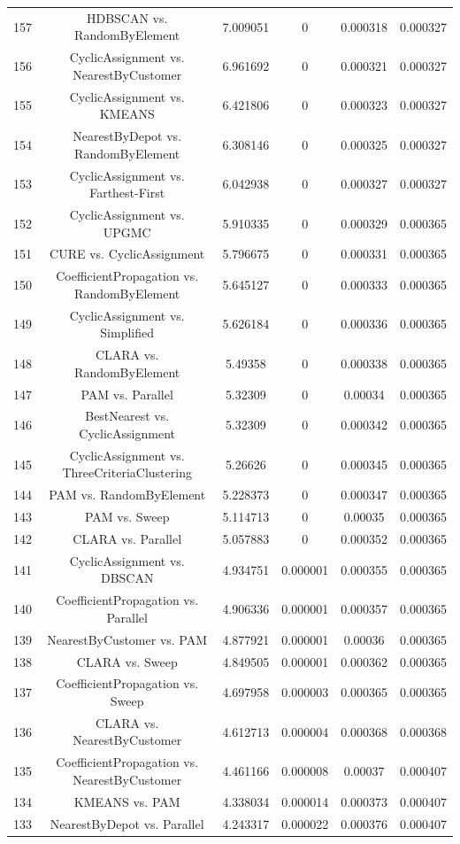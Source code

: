 \documentclass[a4paper,10pt]{article}
\begin{document}
\begin{landscape}
\begin{table}[!htp]
\begin{tabular}{cccccc}
157&HDBSCAN vs. RandomByElement&7.009051&0&0.000318&0.000327\\
156&CyclicAssignment vs. NearestByCustomer&6.961692&0&0.000321&0.000327\\
155&CyclicAssignment vs. KMEANS&6.421806&0&0.000323&0.000327\\
154&NearestByDepot vs. RandomByElement&6.308146&0&0.000325&0.000327\\
153&CyclicAssignment vs. Farthest-First&6.042938&0&0.000327&0.000327\\
152&CyclicAssignment vs. UPGMC&5.910335&0&0.000329&0.000365\\
151&CURE vs. CyclicAssignment&5.796675&0&0.000331&0.000365\\
150&CoefficientPropagation vs. RandomByElement&5.645127&0&0.000333&0.000365\\
149&CyclicAssignment vs. Simplified&5.626184&0&0.000336&0.000365\\
148&CLARA vs. RandomByElement&5.49358&0&0.000338&0.000365\\
147&PAM vs. Parallel&5.32309&0&0.00034&0.000365\\
146&BestNearest vs. CyclicAssignment&5.32309&0&0.000342&0.000365\\
145&CyclicAssignment vs. ThreeCriteriaClustering&5.26626&0&0.000345&0.000365\\
144&PAM vs. RandomByElement&5.228373&0&0.000347&0.000365\\
143&PAM vs. Sweep&5.114713&0&0.00035&0.000365\\
142&CLARA vs. Parallel&5.057883&0&0.000352&0.000365\\
141&CyclicAssignment vs. DBSCAN&4.934751&0.000001&0.000355&0.000365\\
140&CoefficientPropagation vs. Parallel&4.906336&0.000001&0.000357&0.000365\\
139&NearestByCustomer vs. PAM&4.877921&0.000001&0.00036&0.000365\\
138&CLARA vs. Sweep&4.849505&0.000001&0.000362&0.000365\\
137&CoefficientPropagation vs. Sweep&4.697958&0.000003&0.000365&0.000365\\
136&CLARA vs. NearestByCustomer&4.612713&0.000004&0.000368&0.000368\\
135&CoefficientPropagation vs. NearestByCustomer&4.461166&0.000008&0.00037&0.000407\\
134&KMEANS vs. PAM&4.338034&0.000014&0.000373&0.000407\\
133&NearestByDepot vs. Parallel&4.243317&0.000022&0.000376&0.000407\\

\end{tabular}
\end{table}
\end{landscape}
\end{document}
